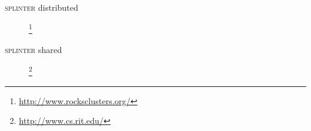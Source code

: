 \documentclass{beamer}
\begin{document}
\begin{frame}{\textsc{splinter} distributed}
  \begin{figure}
    \begin{center}
      \footnote{\url{http://www.rocksclusters.org/}}
    \end{center}
  \end{figure}
\end{frame}

\begin{frame}{\textsc{splinter} shared}
  \begin{figure}
    \begin{center}
      \footnote{\url{http://www.cs.rit.edu/}}
    \end{center}
  \end{figure}
\end{frame}
\end{document}
